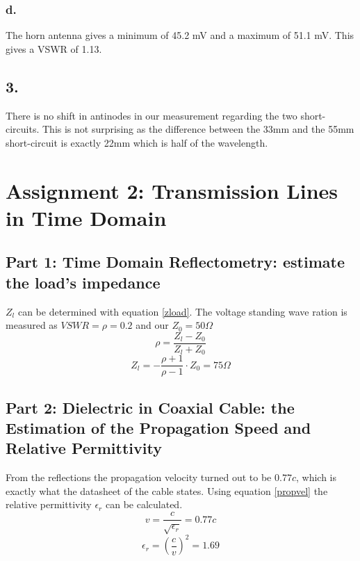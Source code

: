 \documentclass{article}
\begin{document}
	\subsubsection*{d.}
	The horn antenna gives a minimum of 45.2 mV and a maximum of 51.1 mV. This gives a VSWR of 1.13.
	
	\subsection*{3.}
	There is no shift in antinodes in our measurement regarding the two short-circuits. This is not surprising as the difference between the 33mm and the 55mm short-circuit is exactly 22mm which is half of the wavelength.
	
	
	
	\section*{Assignment 2: Transmission Lines in Time Domain}
		\subsection*{Part 1: Time Domain Reflectometry: estimate the load’s impedance}
			$Z_l$ can be determined with equation \ref{zload}. The voltage standing wave ration is measured as $VSWR = \rho = 0.2$ and our $Z_0 = 50 \Omega$
			\begin{equation}
			\label{zload}
				\rho = \frac{Z_l-Z_0}{Z_l+Z_0}
			\end{equation}
			\begin{equation}
				Z_l = - \frac{\rho + 1}{\rho - 1} \cdot Z_0 = 75 \Omega
			\end{equation}
	
		\subsection*{Part 2:  Dielectric in Coaxial Cable: the Estimation of the Propagation Speed and Relative Permittivity}
			From the reflections the propagation velocity turned out to be $0.77c$, which is exactly what the datasheet of the cable states\cite{datasheetcable}. 
			Using equation \ref{propvel} the relative permittivity $\epsilon_r$ can be calculated.
			\begin{equation}
			\label{propvel}
				v = \frac{c}{\sqrt{\epsilon_r}} = 0.77 c
			\end{equation}
			\begin{equation}
				\epsilon_r = (\frac{c}{v})^2 = 1.69
			\end{equation}


	\clearpage
	
	
\end{document}
